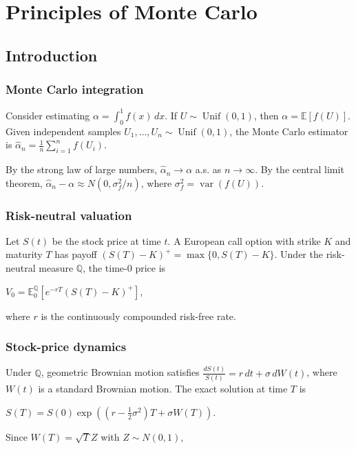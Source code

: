 \section{Principles of Monte Carlo}

\subsection{Introduction}

\subsubsection*{Monte Carlo integration}

Consider estimating $\alpha=\int_0^1 f(x)\,dx$. If $U\sim\operatorname{Unif}(0,1)$, then $\alpha=\mathbb{E}[f(U)]$. Given independent samples $U_1,\ldots,U_n\sim\operatorname{Unif}(0,1)$, the Monte Carlo estimator is
$\hat{\alpha}_n=\frac{1}{n}\sum_{i=1}^n f(U_i)$.

By the strong law of large numbers, $\hat{\alpha}_n\to\alpha$ a.s. as $n\to\infty$. By the central limit theorem,
$\hat{\alpha}_n-\alpha\approx N(0,\sigma_f^2/n)$,
where $\sigma_f^2=\operatorname{var}(f(U))$. 


\subsubsection*{Risk-neutral valuation}

Let $S(t)$ be the stock price at time $t$. A European call option with strike $K$ and maturity $T$ has payoff $(S(T)-K)^+=\max\{0,S(T)-K\}$. Under the risk-neutral measure $\mathbb{Q}$, the time-$0$ price is

$V_0=\mathbb{E}_0^{\mathbb{Q}}\left[e^{-rT}(S(T)-K)^+\right]$,

where $r$ is the continuously compounded risk-free rate.

\subsubsection*{Stock-price dynamics}

Under $\mathbb{Q}$, geometric Brownian motion satisfies $\frac{dS(t)}{S(t)}=r\,dt+\sigma\,dW(t)$, where $W(t)$ is a standard Brownian motion. The exact solution at time $T$ is

$S(T)=S(0)\exp\left((r-\frac{1}{2}\sigma^2)T+\sigma W(T)\right)$.

Since $W(T)=\sqrt{T}Z$ with $Z\sim N(0,1)$,

